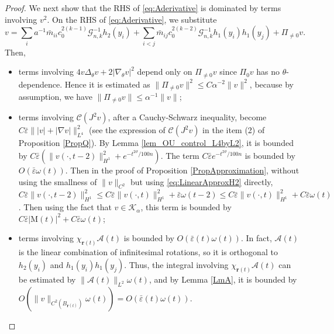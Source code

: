 \documentclass[11pt]{amsart}
\numberwithin{equation}{section}
\numberwithin{equation}{section}
\newcommand{\eps}{\varepsilon}
\newcommand{\br}{\mathbf{r}}
\newcommand{\cA}{\mathcal{A}}
\newcommand{\cK}{\mathcal{K}}
\newcommand{\cG}{\mathcal{G}}
\begin{document}
\begin{proof}
		We next show that the RHS of \eqref{eq:Aderivative} is dominated by terms involving $v^2$. 
		On the RHS of \eqref{eq:Aderivative}, we substitute 
		$$v=\sum_i  a^{-1} \bar m_{ii}c_0^{2(k-1)}\cG_{n,k}^{-1}h_2(y_i)
		+\sum_{i< j}\bar m_{ij} c_0^{2(k-2)}\cG_{n,k}^{-1} h_1(y_i)h_1(y_j)+\Pi_{\neq 0}v.$$
		Then, 
		\begin{itemize}
			\item terms involving $4v\Delta_\theta v+2|\nabla_\theta v|^2$ depend only on $\Pi_{\neq 0}v$ since $\Pi_0v$ has no $\theta$-dependence. Hence it is estimated as $\|\Pi_{\neq 0}v\|^2\leq C\alpha^{-2}\|v\|^2$, because by assumption, we have $\|\Pi_{\neq 0}v\|\leq \alpha^{-1} \|v\|$;
			\item terms involving $\mathcal C(J^2v)$, after a Cauchy-Schwarz inequality, become $C\bar\eps\||v|+|\nabla v|\|_{L^4}^2$ (see the expression of $\mathcal C(J^2v)$ in the item (2) of Proposition \ref{PropQ}). By Lemma \ref{lem_OU_control_L4byL2}, it is bounded by $C\bar\eps(\|v(\cdot,t-2)\|^2_{H^1}+e^{-t^{2\vartheta}/100n})$. The term $C\bar\eps e^{-t^{2\vartheta}/100n}$ is bounded by $O(\bar\eps\omega(t))$. Then in the proof of Proposition \ref{PropApproximation}, without using the smallness of $\|v\|_{C^2}$ but using \eqref{eq:LinearApproxH2} directly, $C\bar\eps\|v(\cdot,t-2)\|^2_{H^1}\leq C\bar\eps\|v(\cdot,t)\|^2_{H^1}+\bar\eps \omega(t-2)\leq C\bar\eps\|v(\cdot,t)\|^2_{H^1}+C\bar\eps\omega(t)$. Then using the fact that $v\in \cK_{\alpha}$, this term is bounded by $C\bar\eps|\mathrm{M}(t)|^2+C\bar\eps \omega(t)$;
			\item terms involving $\chi_{\br(t)}\cA(t)$ is bounded by $O(\bar\eps(t)\omega(t))$. In fact, $\cA(t)$ is the linear combination of infinitesimal rotations, so it is orthogonal to $h_2(y_i)$ and $h_1(y_i)h_1(y_j)$. Thus, the integral involving $\chi_{\br(t)}\cA(t)$ can be estimated by $\|\cA(t)\|_{L^2}\omega(t)$, and by Lemma \ref{LmA}, it is bounded by $O(\|v\|_{C^2(B_{\br(t)})}\omega(t))=O(\bar\eps(t)\omega(t))$.
		\end{itemize}
		

\end{proof}
\end{document}
